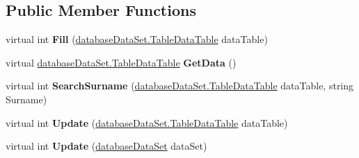 \subsection*{Public Member Functions}
\begin{DoxyCompactItemize}
\item 
\mbox{\label{classprojekt__grupowy_1_1database_data_set_table_adapters_1_1_table_table_adapter_ace766f9057ac5bd14bc51289934f7257}} 
virtual int {\bfseries Fill} (\hyperlink{classprojekt__grupowy_1_1database_data_set_1_1_table_data_table}{database\+Data\+Set.\+Table\+Data\+Table} data\+Table)
\item 
\mbox{\label{classprojekt__grupowy_1_1database_data_set_table_adapters_1_1_table_table_adapter_addaae946c2860e16b770bd5ccd0bd95c}} 
virtual \hyperlink{classprojekt__grupowy_1_1database_data_set_1_1_table_data_table}{database\+Data\+Set.\+Table\+Data\+Table} {\bfseries Get\+Data} ()
\item 
\mbox{\label{classprojekt__grupowy_1_1database_data_set_table_adapters_1_1_table_table_adapter_aa99c217f49e294ac250f80c25319bff5}} 
virtual int {\bfseries Search\+Surname} (\hyperlink{classprojekt__grupowy_1_1database_data_set_1_1_table_data_table}{database\+Data\+Set.\+Table\+Data\+Table} data\+Table, string Surname)
\item 
\mbox{\label{classprojekt__grupowy_1_1database_data_set_table_adapters_1_1_table_table_adapter_a68ea68db5595a8527d78b01f4eba364c}} 
virtual int {\bfseries Update} (\hyperlink{classprojekt__grupowy_1_1database_data_set_1_1_table_data_table}{database\+Data\+Set.\+Table\+Data\+Table} data\+Table)
\item 
\mbox{\label{classprojekt__grupowy_1_1database_data_set_table_adapters_1_1_table_table_adapter_a86945efeb90b97afc51c0065cf7fc4c9}} 
virtual int {\bfseries Update} (\hyperlink{classprojekt__grupowy_1_1database_data_set}{database\+Data\+Set} data\+Set)
\item 

\end{DoxyCompactItemize}
